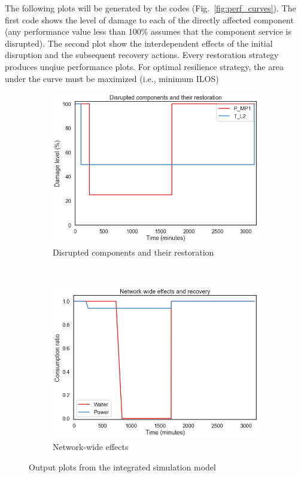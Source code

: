 \documentclass[letterpaper,12pt,english]{sphinxmanual}
\begin{document}
The following plots will be generated by the codes (Fig.~\ref{fig:perf_curves}). The first code shows the level of damage to each of the directly affected component (any performance value less than 100\% assumes that the component service is disrupted). The second plot show the interdependent effects of the initial disruption and the subsequent recovery actions. Every restoration strategy produces unqiue performance plots. For optimal resilience strategy, the area under the curve must be maximized (i.e., minimum ILOS)
\begin{figure}[h!]
	\centering
	\begin{subfigure}[h]{0.5\textwidth}
		\centering
		\includegraphics[width=\textwidth]{direct_effects.PNG}
		\caption{Disrupted components and their restoration}
	\end{subfigure}~
	\begin{subfigure}[h]{0.45\textwidth}
		\centering
		\includegraphics[width = 1.1\textwidth]{indirect_effects.PNG}
		\caption{Network-wide effects}
	\end{subfigure}
	\caption{Output plots from the integrated simulation model}
	\label{fig:graphs}
\end{figure}
\end{document}
